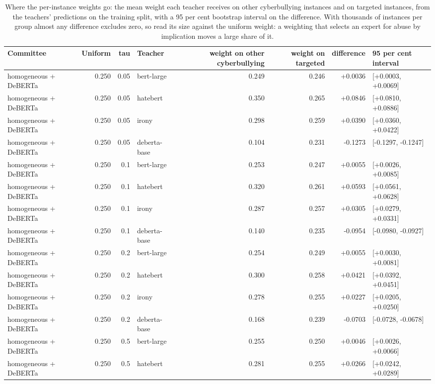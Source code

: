 \begin{table}[t]
\centering
\caption{Where the per-instance weights go: the mean weight each teacher receives on other cyberbullying instances and on targeted instances, from the teachers' predictions on the training split, with a 95 per cent bootstrap interval on the difference. With thousands of instances per group almost any difference excludes zero, so read its size against the uniform weight: a weighting that selects an expert for abuse by implication moves a large share of it.}
\label{tab:routing}
\begin{tabular}{lrrlrrrl}
\toprule
Committee & Uniform & tau & Teacher & weight on other cyberbullying & weight on targeted & difference & 95 per cent interval \\
\midrule
homogeneous + DeBERTa & 0.250 & 0.05 & bert-large & 0.249 & 0.246 & +0.0036 & [+0.0003, +0.0069] \\
homogeneous + DeBERTa & 0.250 & 0.05 & hatebert & 0.350 & 0.265 & +0.0846 & [+0.0810, +0.0886] \\
homogeneous + DeBERTa & 0.250 & 0.05 & irony & 0.298 & 0.259 & +0.0390 & [+0.0360, +0.0422] \\
homogeneous + DeBERTa & 0.250 & 0.05 & deberta-base & 0.104 & 0.231 & -0.1273 & [-0.1297, -0.1247] \\
homogeneous + DeBERTa & 0.250 & 0.1 & bert-large & 0.253 & 0.247 & +0.0055 & [+0.0026, +0.0085] \\
homogeneous + DeBERTa & 0.250 & 0.1 & hatebert & 0.320 & 0.261 & +0.0593 & [+0.0561, +0.0628] \\
homogeneous + DeBERTa & 0.250 & 0.1 & irony & 0.287 & 0.257 & +0.0305 & [+0.0279, +0.0331] \\
homogeneous + DeBERTa & 0.250 & 0.1 & deberta-base & 0.140 & 0.235 & -0.0954 & [-0.0980, -0.0927] \\
homogeneous + DeBERTa & 0.250 & 0.2 & bert-large & 0.254 & 0.249 & +0.0055 & [+0.0030, +0.0081] \\
homogeneous + DeBERTa & 0.250 & 0.2 & hatebert & 0.300 & 0.258 & +0.0421 & [+0.0392, +0.0451] \\
homogeneous + DeBERTa & 0.250 & 0.2 & irony & 0.278 & 0.255 & +0.0227 & [+0.0205, +0.0250] \\
homogeneous + DeBERTa & 0.250 & 0.2 & deberta-base & 0.168 & 0.239 & -0.0703 & [-0.0728, -0.0678] \\
homogeneous + DeBERTa & 0.250 & 0.5 & bert-large & 0.255 & 0.250 & +0.0046 & [+0.0026, +0.0066] \\
homogeneous + DeBERTa & 0.250 & 0.5 & hatebert & 0.281 & 0.255 & +0.0266 & [+0.0242, +0.0289] \\

\end{tabular}
\end{table}
